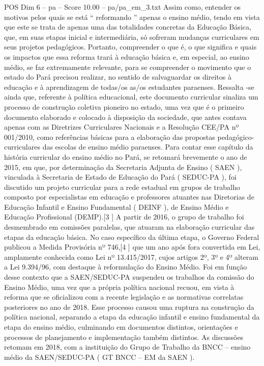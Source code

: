\begin{textsample}{POS Dim 6 – pa – Score 10.00 – pa/pa\_em\_3.txt}
Assim como, entender os motivos pelos quais se está “ reformando ” apenas o ensino médio, tendo em vista que este se trata de apenas uma das totalidades concretas da Educação Básica, que, em suas etapas inicial e intermediária, só sofreram mudanças curriculares em seus projetos pedagógicos.
Portanto, compreender o que é, o que significa e quais os impactos que essa reforma trará à educação básica e, em especial, ao ensino médio, se faz extremamente relevante, para se compreender o movimento que o estado do Pará precisou realizar, no sentido de salvaguardar os direitos à educação e à aprendizagem de todas/os as/os estudantes paraenses.
Ressalta -se ainda que, referente à política educacional, este documento curricular sinaliza um processo de construção coletiva pioneiro no estado, uma vez que é o primeiro documento elaborado e colocado à disposição da sociedade, que antes contava apenas com as Diretrizes Curriculares Nacionais e a Resolução CEE/PA nº 001/2010, como referências básicas para a elaboração das propostas pedagógico-curriculares das escolas de ensino médio paraenses.
Para contar esse capítulo da história curricular do ensino médio no Pará, se retomará brevemente o ano de 2015, em que, por determinação da Secretaria Adjunta de Ensino ( SAEN ), vinculada à Secretaria de Estado de Educação do Pará ( SEDUC-PA ), foi discutido um projeto curricular para a rede estadual em grupos de trabalho composto por especialistas em educação e professores atuantes nas Diretorias de Educação Infantil e Ensino Fundamental ( DEINF ), de Ensino Médio e Educação Profissional (DEMP).[3 ] A partir de 2016, o grupo de trabalho foi desmembrado em comissões paralelas, que atuaram na elaboração curricular das etapas da educação básica.
No caso específico da última etapa, o Governo Federal publicou a Medida Provisória nº 746,[4 ] que um ano após fora convertida em Lei, amplamente conhecida como Lei nº 13.415/2017, cujos artigos 2º, 3º e 4º alteram a Lei 9.394/96, com destaque à reformulação do Ensino Médio.
Foi em função desse contexto que a SAEN/SEDUC-PA suspendeu os trabalhos da comissão do Ensino Médio, uma vez que a própria política nacional recuou, em vista à reforma que se oficializou com a recente legislação e as normativas correlatas posteriores no ano de 2018.
Esse processo causou uma ruptura na construção da política nacional, separando a etapa da educação infantil e ensino fundamental da etapa do ensino médio, culminando em documentos distintos, orientações e processos de planejamento e implementação também distintos.
As discussões retomam em 2018, com a instituição do Grupo de Trabalho da BNCC – ensino médio da SAEN/SEDUC-PA ( GT BNCC – EM da SAEN ).

\end{textsample}

